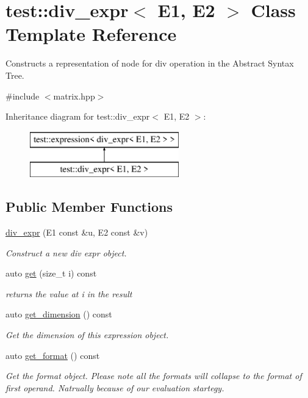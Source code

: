 \hypertarget{classtest_1_1div__expr}{}\section{test\+::div\+\_\+expr$<$ E1, E2 $>$ Class Template Reference}
\label{classtest_1_1div__expr}


Constructs a representation of node for div operation in the Abstract Syntax Tree.  




{\ttfamily \#include $<$matrix.\+hpp$>$}

Inheritance diagram for test\+::div\+\_\+expr$<$ E1, E2 $>$\+:\begin{figure}[H]
\begin{center}
\leavevmode
\includegraphics[height=2.000000cm]{classtest_1_1div__expr}
\end{center}
\end{figure}
\subsection*{Public Member Functions}
\begin{DoxyCompactItemize}
\item 
\mbox{\hyperlink{classtest_1_1div__expr_a957776b1695f22338e6e425957e55f0c}{div\+\_\+expr}} (E1 const \&u, E2 const \&v)
\begin{DoxyCompactList}\small\item\em Construct a new div expr object. \end{DoxyCompactList}\item 
auto \mbox{\hyperlink{classtest_1_1div__expr_ace8d78b6843d8233525f767cd0096a74}{get}} (size\+\_\+t i) const
\begin{DoxyCompactList}\small\item\em returns the value at i in the result \end{DoxyCompactList}\item 
auto \mbox{\hyperlink{classtest_1_1div__expr_a8ef783b35224398db59e2b042917363e}{get\+\_\+dimension}} () const
\begin{DoxyCompactList}\small\item\em Get the dimension of this expression object. \end{DoxyCompactList}\item 
auto \mbox{\hyperlink{classtest_1_1div__expr_af40ab6cc22828f40ebe6b38075a35ede}{get\+\_\+format}} () const
\begin{DoxyCompactList}\small\item\em Get the format object. Please note all the formats will collapse to the format of first operand. Natrually because of our evaluation startegy. \end{DoxyCompactList}\end{DoxyCompactItemize}



